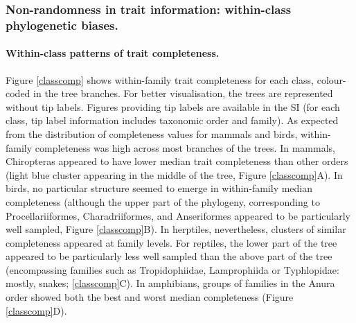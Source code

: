 \pagebreak
\subsubsection{Non-randomness in trait information: within-class phylogenetic biases.}

\paragraph{Within-class patterns of trait completeness.}
Figure \ref{classcomp} shows within-family trait completeness for each class, colour-coded in the tree branches. For better visualisation, the trees are represented without tip labels. Figures providing tip labels are available in the SI (for each class, tip label information includes taxonomic order and family). As expected from the distribution of completeness values for mammals and birds, within-family completeness was high across most branches of the trees. In mammals, Chiropteras appeared to have lower median trait completeness than other orders (light blue cluster appearing in the middle of the tree, Figure \ref{classcomp}A). In birds, no particular structure seemed to emerge in within-family median completeness (although the upper part of the phylogeny, corresponding to Procellariiformes, Charadriiformes, and Anseriformes appeared to be particularly well sampled, Figure \ref{classcomp}B). In herptiles, nevertheless, clusters of similar completeness appeared at family levels. For reptiles, the lower part of the tree appeared to be particularly less well sampled than the above part of the tree (encompassing families such as Tropidophiidae, Lamprophiida or Typhlopidae: mostly, snakes; \ref{classcomp}C). In amphibians, groups of families in the Anura order showed both the best and worst median completeness (Figure \ref{classcomp}D). 

